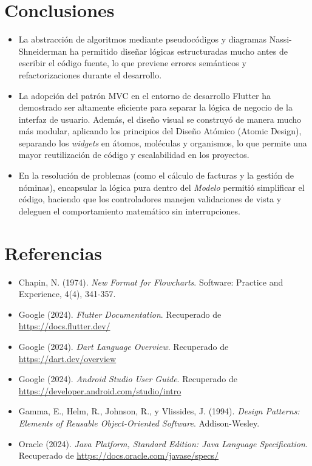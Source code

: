 \documentclass[12pt, a4paper]{article}
\begin{document}
\newpage
\section{Conclusiones}
\begin{itemize}
    \item La abstracción de algoritmos mediante pseudocódigos y diagramas Nassi-Shneiderman ha permitido diseñar lógicas estructuradas mucho antes de escribir el código fuente, lo que previene errores semánticos y refactorizaciones durante el desarrollo.
    \item La adopción del patrón MVC en el entorno de desarrollo Flutter ha demostrado ser altamente eficiente para separar la lógica de negocio de la interfaz de usuario. Además, el diseño visual se construyó de manera mucho más modular, aplicando los principios del Diseño Atómico (Atomic Design), separando los \textit{widgets} en átomos, moléculas y organismos, lo que permite una mayor reutilización de código y escalabilidad en los proyectos.
    \item En la resolución de problemas (como el cálculo de facturas y la gestión de nóminas), encapsular la lógica pura dentro del \textit{Modelo} permitió simplificar el código, haciendo que los controladores manejen validaciones de vista y deleguen el comportamiento matemático sin interrupciones.
\end{itemize}

\section{Referencias}
\begin{itemize}
    \item Chapin, N. (1974). \textit{New Format for Flowcharts}. Software: Practice and Experience, 4(4), 341-357.
  \item Google (2024). \textit{Flutter Documentation}. Recuperado de \url{https://docs.flutter.dev/}
  \item Google (2024). \textit{Dart Language Overview}. Recuperado de \url{https://dart.dev/overview}
  \item Google (2024). \textit{Android Studio User Guide}. Recuperado de \url{https://developer.android.com/studio/intro}
    \item Gamma, E., Helm, R., Johnson, R., y Vlissides, J. (1994). \textit{Design Patterns: Elements of Reusable Object-Oriented Software}. Addison-Wesley.
  \item Oracle (2024). \textit{Java Platform, Standard Edition: Java Language Specification}. Recuperado de \url{https://docs.oracle.com/javase/specs/}
\end{itemize}
\end{document}
